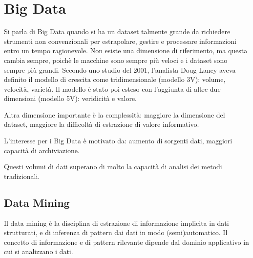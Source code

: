 \chapter{Big Data}
\label{chp:big-data}

Si parla di Big Data quando si ha un dataset talmente grande da richiedere
strumenti non convenzionali per estrapolare, gestire e processare informazioni
entro un tempo ragionevole. Non esiste una dimensione di riferimento, ma questa
cambia sempre, poichè le macchine sono sempre più veloci e i dataset sono
sempre più grandi. Secondo uno studio del 2001, l’analista Doug Laney aveva
definito il modello di crescita come tridimensionale (modello 3V): volume, velocità, varietà. Il modello è stato poi esteso con l'aggiunta di altre due dimensioni (modello 5V): veridicità e valore.

Altra dimensione importante è la complessità: maggiore la dimensione del dataset, maggiore la difficoltà di estrazione di valore informativo.

L'interesse per i Big Data è motivato da: aumento di sorgenti dati, maggiori capacità di archiviazione.

Questi volumi di dati superano di molto la capacità di analisi dei metodi tradizionali.

\section{Data Mining}
\label{sec:data-mining}
Il data mining è la disciplina di estrazione di informazione implicita in dati strutturati, e di inferenza di pattern dai dati in modo (semi)automatico.
Il concetto di informazione e di pattern rilevante dipende dal dominio applicativo in cui si analizzano i dati.
